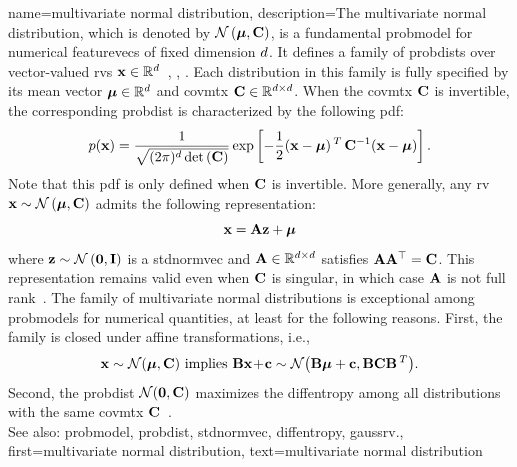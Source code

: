 	
{name={multivariate normal distribution}, 
	description={The multivariate normal distribution, 
		which is denoted by $\mathcal{N}\left({\bm \mu},{\bf C}\right)$, is a fundamental 
		\gls{probmodel} for numerical \glspl{featurevec} of fixed dimension $d$. 
		It defines a family of \glspl{probdist} over \gls{vector}-valued \glspl{rv} 
		${\bf x} \in \mathbb{R}^{d}$~\cite{BertsekasProb}, \cite{GrayProbBook}, \cite{Lapidoth09}. 
		Each distribution in this family is fully specified by its \gls{mean} \gls{vector} 
		${\bm \mu} \in \mathbb{R}^{d}$ and \gls{covmtx} 
		${\bf C} \in \mathbb{R}^{d \times d}$. When the 
		\gls{covmtx} ${\bf C}$ is invertible, the corresponding \gls{probdist} is 
		characterized by the following \gls{pdf}:
		\[p({\bf x}) = 
 		\frac{1}{\sqrt{(2\pi)^{d} \det\,({\bf C})}} 
 		\exp\left[ -\frac{1}{2} 
 		({\bf x} - {\bm \mu})\,^{T}\, {\bf C}^{-1} 
 		({\bf x} - {\bm \mu}) \right].
 		\]
		Note that this \gls{pdf} is only defined when ${\bf C}$ is invertible.
   		More generally, any \gls{rv} ${\bf x} \sim \mathcal{N}\left({\bm \mu},{\bf C}\right)$ 
   		admits the following representation:
  		\[
    		{\bf x} = {\bf A} {\bf z} + {\bm \mu}
   		\]
   		where ${\bf z} \sim \mathcal{N}\left(\mathbf{0},\mathbf{I}\right)$ is a \gls{stdnormvec} 
   		and ${\bf A} \in \mathbb{R}^{d \times d}$ satisfies ${\bf A} {\bf A}^\top = {\bf C}$. 
   		This representation remains valid even when ${\bf C}$ is singular, in which case ${\bf A}$ 
   		is not full rank~\cite[Ch. 23]{Lapidoth2017}.
   		The family of multivariate normal distributions is exceptional among \glspl{probmodel} for numerical 
   		quantities, at least for the following reasons. First, the family is closed under affine 
   		transformations, i.e.,
		\[ 
		{\bf x} \sim \mathcal{N}({\bm \mu},{\bf C}) \mbox{ implies } 
		{\bf B}{\bf x}\!+\!{\bf c} \sim \mathcal{N}\big( {\bf B}{\bm \mu}+{\bf c},{\bf B} {\bf C} {\bf B}\,^{T} \big). 
		\]
		Second, the \gls{probdist} $\mathcal{N}(\mathbf{0},{\bf C})$ maximizes the 
		\gls{diffentropy} among all distributions with the same \gls{covmtx} ${\bf C}$~\cite{coverthomas}. 
		\\ 
		See also: \gls{probmodel}, \gls{probdist}, \gls{stdnormvec}, \gls{diffentropy}, \gls{gaussrv}.}, 
	first={multivariate normal distribution},
	text={multivariate normal distribution}
}

